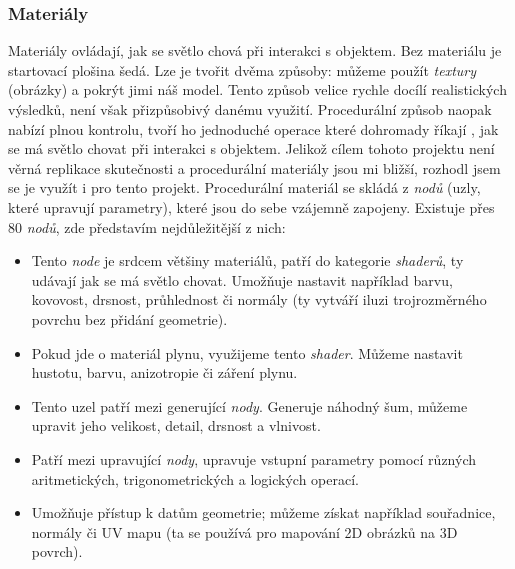 {\newpage

\subsubsection{Materiály}
{Materiály ovládají, jak se světlo chová při interakci s objektem. Bez materiálu je startovací plošina šedá.}\odst
{Lze je tvořit dvěma způsoby: můžeme použít \textit{textury} (obrázky) a pokrýt jimi náš model. Tento způsob velice rychle docílí realistických výsledků, není však přizpůsobivý danému využití. Procedurální způsob naopak nabízí plnou kontrolu, tvoří ho jednoduché operace které dohromady říkají , jak se má světlo chovat při interakci s objektem.}\odst
{Jelikož cílem tohoto projektu není věrná replikace skutečnosti a procedurální materiály jsou mi bližší, rozhodl jsem se je využít i pro tento projekt. Procedurální materiál se skládá z \textit{nodů} (uzly, které upravují parametry), které jsou do sebe vzájemně zapojeny. Existuje přes 80 \textit{nodů}, zde představím nejdůležitější z nich:}

\begin{itemize}
    \item {}\par
        {Tento \textit{node} je srdcem většiny materiálů, patří do kategorie \textit{shaderů}, ty udávají jak se má světlo chovat. Umožňuje nastavit například barvu, kovovost, drsnost, průhlednost či normály (ty vytváří iluzi trojrozměrného povrchu bez přidání geometrie).}
    \item {}\par
        {Pokud jde o materiál plynu, využijeme tento \textit{shader}. Můžeme nastavit hustotu, barvu, anizotropie či záření plynu.}
    \item {}\par
        {Tento uzel patří mezi generující \textit{nody}. Generuje náhodný šum, můžeme upravit jeho velikost, detail, drsnost a vlnivost.}
    \item {}\par
        {Patří mezi upravující \textit{nody}, upravuje vstupní parametry pomocí různých aritmetických, trigonometrických a logických operací.}
    \item {}\par
        {Umožňuje přístup k datům geometrie; můžeme získat například souřadnice, normály či UV mapu (ta se používá pro mapování 2D obrázků na 3D povrch).}
\end{itemize}

}
